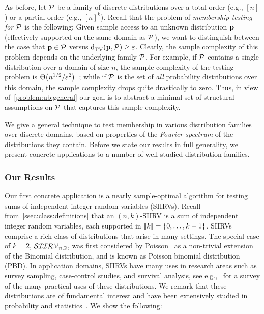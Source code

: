
As before, let $\property$ be a family of discrete distributions over a total order (e.g., $[n]$)
or a partial order (e.g., $[n]^k$). 
Recall that the problem of \emph{membership testing for $\property$} is the following:
Given sample access to an unknown distribution $\p$ (effectively supported 
on the same domain as $\property$),
we want to distinguish between the case that $\p \in \property$ versus $\totalvardist{\p}{\property} \geq \eps$. Clearly, the sample complexity of this problem depends on the underlying family $\property$. For example, if $\property$ contains a single distribution over a domain of size $n$,
the sample complexity of the testing problem is $\bigTheta{n^{1/2}/\eps^2}$~\cite{Paninski:08,CDVV:14, DKN:15}; while if $\property$ is the set of \emph{all} probability distributions over this domain, the sample complexity drops quite drastically to zero. Thus, in view of~\cref{problem:ub:general} our goal is to abstract a minimal set of structural assumptions on $\property$ that captures this sample complexity.

We give a general technique to test membership in various distribution families over discrete domains, based on properties of the \emph{Fourier spectrum} of the distributions they contain.
Before we state our results in full generality, we present concrete applications to 
a number of well-studied distribution families.

\subsubsection{Our Results} \label{ssec:results}

Our first concrete application is a nearly sample-optimal algorithm for testing
sums of independent integer random variables (SIIRVs). 
Recall from~\cref{ssec:class:definitions} that an $(n, k)$-SIIRV is a sum of independent integer random variables, each supported in $\modulo{k}=\{0,\dots,k-1\}$.
SIIRVs comprise a rich class of distributions that arise in many settings. The special case of $k=2$, $\classksiirv[n]{2}$,
was first considered by Poisson~\cite{Poisson:37} as a non-trivial extension of the Binomial distribution,
and is known as Poisson binomial distribution (PBD). In application domains, SIIRVs have many uses in research areas
such as survey sampling, case-control studies, and survival analysis, see e.g.,~\cite{CL:97} for a survey of the many practical uses of these distributions.
We remark that these distributions are of fundamental interest and have been extensively 
studied in probability and statistics~\cite{Chernoff:52,Hoeffding:63,DP:09, Presman:83,Kruopis:86,BHJ:92,CGS11}.
We show the following:


